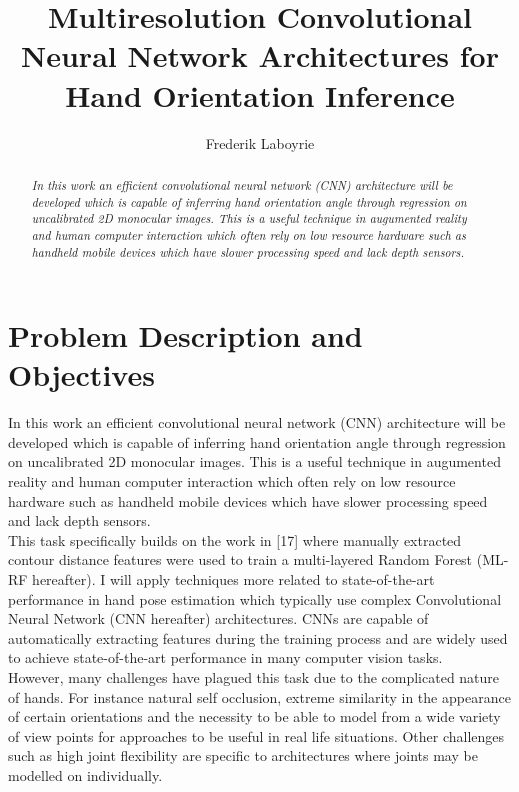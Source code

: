 \documentclass{article}
\begin{document}
\author{Frederik Laboyrie}
\title{Multiresolution Convolutional Neural Network Architectures for Hand Orientation Inference}
\maketitle
\begin{abstract}
\emph{In this work an efficient convolutional neural network (CNN) architecture will be developed which is capable of inferring hand orientation angle through regression on uncalibrated 2D monocular images. This is a useful technique in augumented reality and human computer interaction which often rely on low resource hardware such as handheld mobile devices which have slower processing speed and lack depth sensors.}
\end{abstract}

\pagebreak


\section{Problem Description and Objectives}

In this work an efficient convolutional neural network (CNN) architecture will be developed which is capable of inferring hand orientation angle through regression on uncalibrated 2D monocular images. This is a useful technique in augumented reality and human computer interaction which often rely on low resource hardware such as handheld mobile devices which have slower processing speed and lack depth sensors.\\

This task specifically builds on the work in [17] where manually extracted contour distance features were used to train a multi-layered Random Forest (ML-RF hereafter). I will apply techniques more related to state-of-the-art performance in hand pose estimation which typically use complex Convolutional Neural Network (CNN hereafter) architectures. CNNs are capable of automatically extracting features during the training process and are widely used to achieve state-of-the-art performance in many computer vision tasks. \\

However, many challenges have plagued this task due to the complicated nature of hands. For instance natural self occlusion, extreme similarity in the appearance of certain orientations and the necessity to be able to model from a wide variety of view points for approaches to be useful in real life situations. Other challenges such as high joint flexibility are specific to architectures where joints may be modelled on individually. \\
\end{document}
